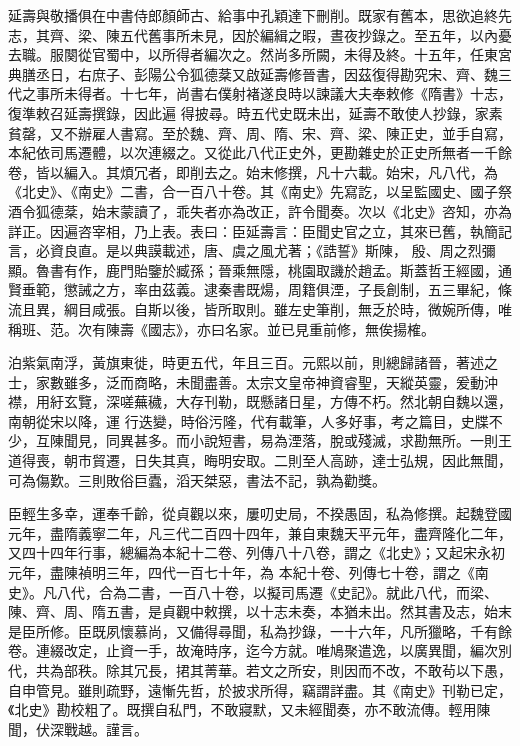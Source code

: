 \begin{pinyinscope}
 延壽與敬播俱在中書侍郎顏師古、給事中孔穎達下刪削。既家有舊本，思欲追終先志，其齊、梁、陳五代舊事所未見，因於編緝之暇，晝夜抄錄之。至五年，以內憂去職。服闋從官蜀中，以所得者編次之。然尚多所闕，未得及終。十五年，任東宮典膳丞日，右庶子、彭陽公令狐德棻又啟延壽修晉書，因茲復得勘究宋、齊、魏三代之事所未得者。十七年，尚書右僕射褚遂良時以諫議大夫奉敕修《隋書》十志，復準敕召延壽撰錄，因此遍
 得披尋。時五代史既未出，延壽不敢使人抄錄，家素貧罄，又不辦雇人書寫。至於魏、齊、周、隋、宋、齊、梁、陳正史，並手自寫，本紀依司馬遷體，以次連綴之。又從此八代正史外，更勘雜史於正史所無者一千餘卷，皆以編入。其煩冗者，即削去之。始末修撰，凡十六載。始宋，凡八代，為《北史》、《南史》二書，合一百八十卷。其《南史》先寫訖，以呈監國史、國子祭酒令狐德棻，始末蒙讀了，乖失者亦為改正，許令聞奏。次以《北史》咨知，亦為詳正。因遍咨宰相，乃上表。表曰：臣延壽言：臣聞史官之立，其來已舊，執簡記言，必資良直。是以典謨載述，唐、虞之風尤著；《誥誓》斯陳，
 殷、周之烈彌顯。魯書有作，鹿門貽鑒於臧孫；晉乘無隱，桃園取譏於趙孟。斯蓋哲王經國，通賢垂範，懲誡之方，率由茲義。逮秦書既煬，周籍俱湮，子長創制，五三畢紀，條流且異，綱目咸張。自斯以後，皆所取則。雖左史筆削，無乏於時，微婉所傳，唯稱班、范。次有陳壽《國志》，亦曰名家。並已見重前修，無俟揚榷。



 泊紫氣南浮，黃旗東徙，時更五代，年且三百。元熙以前，則總歸諸晉，著述之士，家數雖多，泛而商略，未聞盡善。太宗文皇帝神資睿聖，天縱英靈，爰動沖襟，用紆玄覽，深嗟蕪穢，大存刊勒，既懸諸日星，方傳不朽。然北朝自魏以還，南朝從宋以降，運
 行迭變，時俗污隆，代有載筆，人多好事，考之篇目，史牒不少，互陳聞見，同異甚多。而小說短書，易為湮落，脫或殘滅，求勘無所。一則王道得喪，朝市貿遷，日失其真，晦明安取。二則至人高跡，達士弘規，因此無聞，可為傷歎。三則敗俗巨蠹，滔天桀惡，書法不記，孰為勸獎。



 臣輕生多幸，運奉千齡，從貞觀以來，屢叨史局，不揆愚固，私為修撰。起魏登國元年，盡隋義寧二年，凡三代二百四十四年，兼自東魏天平元年，盡齊隆化二年，又四十四年行事，總編為本紀十二卷、列傳八十八卷，謂之《北史》；又起宋永初元年，盡陳禎明三年，四代一百七十年，為
 本紀十卷、列傳七十卷，謂之《南史》。凡八代，合為二書，一百八十卷，以擬司馬遷《史記》。就此八代，而梁、陳、齊、周、隋五書，是貞觀中敕撰，以十志未奏，本猶未出。然其書及志，始末是臣所修。臣既夙懷慕尚，又備得尋聞，私為抄錄，一十六年，凡所獵略，千有餘卷。連綴改定，止資一手，故淹時序，迄今方就。唯鳩聚遣逸，以廣異聞，編次別代，共為部秩。除其冗長，捃其菁華。若文之所安，則因而不改，不敢茍以下愚，自申管見。雖則疏野，遠慚先哲，於披求所得，竊謂詳盡。其《南史》刊勒已定，《北史》勘校粗了。既撰自私門，不敢寢默，又未經聞奏，亦不敢流傳。輕用陳
 聞，伏深戰越。謹言。



\end{pinyinscope}